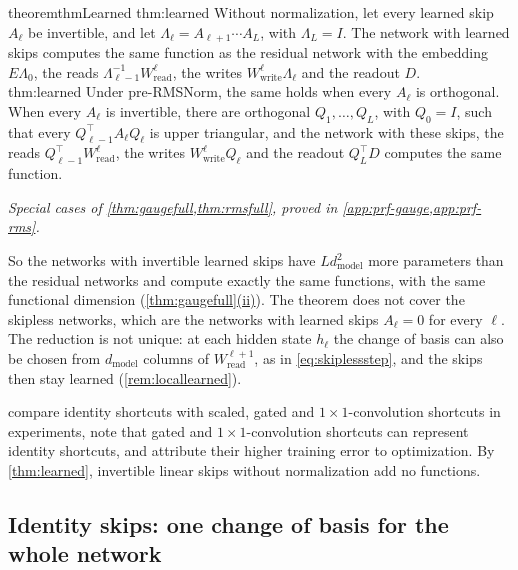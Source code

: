 \documentclass[10pt]{article}
\theoremstyle{definition}
\theoremstyle{remark}
\newcommand{\Wread}{W_{\mathrm{read}}}
\newcommand{\Wwrite}{W_{\mathrm{write}}}
\newcommand{\dm}{d_{\mathrm{model}}}
\newcommand{\ptlabel}[1]{\phantomsection\label{#1}}
\DeclareRobustCommand{\cpref}[2]{\hyperref[#1:#2]{\cref*{#1}(#2)}}
\newcommand{\stpart}[3]{\ifx\relax#1\relax\else\ptlabel{#1:#2}\fi{\upshape\bfseries\boldmath(#2)\ifx\relax#3\relax\else\ #3.\fi}}
\begin{document}
\begin{restatable}{theorem}{thmLearned}\label{thm:learned}
\stpart{thm:learned}{i}{} Without normalization, let every learned skip $A_\ell$ be invertible, and let $\Lambda_\ell = A_{\ell+1}\cdots A_L$, with $\Lambda_L = I$. The network with learned skips computes the same function as the residual network with the embedding $E\Lambda_0$, the reads $\Lambda_{\ell-1}^{-1}\Wread^{\ell}$, the writes $\Wwrite^{\ell}\Lambda_\ell$ and the readout $D$.\\
\stpart{thm:learned}{ii}{} Under pre-RMSNorm, the same holds when every $A_\ell$ is orthogonal. When every $A_\ell$ is invertible, there are orthogonal $Q_1, \dots, Q_L$, with $Q_0 = I$, such that every $Q_{\ell-1}^\top A_\ell Q_\ell$ is upper triangular, and the network with these skips, the reads $Q_{\ell-1}^\top\Wread^{\ell}$, the writes $\Wwrite^{\ell}Q_\ell$ and the readout $Q_L^\top D$ computes the same function.
\end{restatable}
\par\vspace{-0.4\baselineskip}\noindent\hfill{\small\itshape Special cases of \cref{thm:gaugefull,thm:rmsfull}, proved in \cref{app:prf-gauge,app:prf-rms}.}\par\smallskip

So the networks with invertible learned skips have $L\dm^2$ more parameters than the residual networks and compute exactly the same functions, with the same functional dimension (\cpref{thm:gaugefull}{ii}). The theorem does not cover the skipless networks, which are the networks with learned skips $A_\ell = 0$ for every $\ell$. The reduction is not unique: at each hidden state $h_\ell$ the change of basis can also be chosen from $\dm$ columns of $\Wread^{\ell+1}$, as in \eqref{eq:skiplessstep}, and the skips then stay learned (\cref{rem:locallearned}).

\citet{he2016xidentity} compare identity shortcuts with scaled, gated and $1\times1$-convolution shortcuts in experiments, note that gated and $1\times1$-convolution shortcuts can represent identity shortcuts, and attribute their higher training error to optimization. By \cref{thm:learned}, invertible linear skips without normalization add no functions.

\subsection{Identity skips: one change of basis for the whole network}\label{sec:global}\label{sec:gaugefix}
\end{document}
